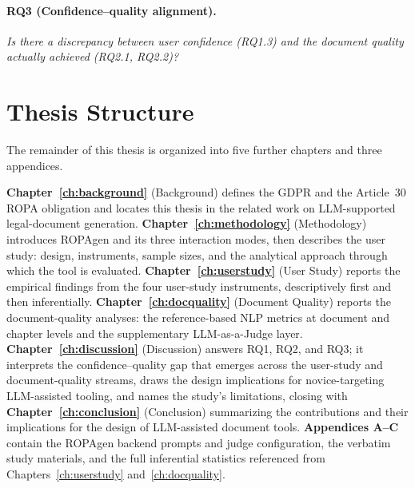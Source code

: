 \paragraph{RQ3 (Confidence--quality alignment).} \emph{Is there a discrepancy between user confidence (RQ1.3) and the document quality actually achieved (RQ2.1, RQ2.2)?}

\section{Thesis Structure}
\label{sec:thesis-structure}

The remainder of this thesis is organized into five further
chapters and three appendices.

\textbf{Chapter~\ref{ch:background}} (Background) defines the GDPR
and the Article~30 ROPA obligation and locates this thesis in the
related work on LLM-supported legal-document generation.
\textbf{Chapter~\ref{ch:methodology}} (Methodology) introduces
ROPAgen and its three interaction modes, then describes the user
study: design, instruments, sample sizes, and the analytical
approach through which the tool is evaluated.
\textbf{Chapter~\ref{ch:userstudy}} (User Study) reports the
empirical findings from the four user-study instruments,
descriptively first and then inferentially.
\textbf{Chapter~\ref{ch:docquality}} (Document Quality) reports
the document-quality analyses: the reference-based NLP metrics at
document and chapter levels and the supplementary LLM-as-a-Judge
layer.
\textbf{Chapter~\ref{ch:discussion}} (Discussion) answers RQ1,
RQ2, and RQ3; it interprets the
confidence--quality gap that emerges across the user-study and
document-quality streams, draws the design implications for
novice-targeting LLM-assisted tooling, and names the study's
limitations, closing with \textbf{Chapter~\ref{ch:conclusion}} (Conclusion) summarizing
the contributions and their implications for the design of LLM-assisted document tools.
\textbf{Appendices A--C} contain the ROPAgen backend prompts and
judge configuration, the verbatim study materials, and the full
inferential statistics referenced from
Chapters~\ref{ch:userstudy} and~\ref{ch:docquality}.
